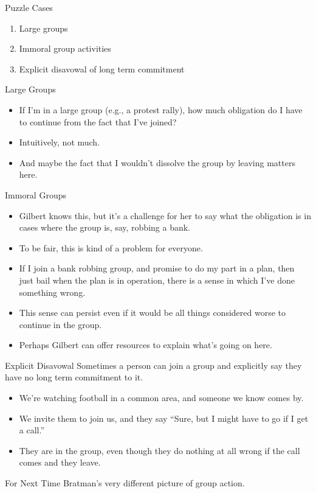 \documentclass[
  ignorenonframetext,
]{beamer}
\providecommand{\tightlist}{%
  \setlength{\itemsep}{0pt}\setlength{\parskip}{0pt}}
\begin{document}
\begin{frame}{Puzzle Cases}
\protect\hypertarget{puzzle-cases}{}
\begin{enumerate}
\tightlist
\item
  Large groups
\item
  Immoral group activities
\item
  Explicit disavowal of long term commitment
\end{enumerate}
\end{frame}

\begin{frame}{Large Groups}
\protect\hypertarget{large-groups}{}
\begin{itemize}
\tightlist
\item
  If I'm in a large group (e.g., a protest rally), how much obligation
  do I have to continue from the fact that I've joined?
\item
  Intuitively, not much.
\item
  And maybe the fact that I wouldn't dissolve the group by leaving
  matters here.
\end{itemize}
\end{frame}

\begin{frame}{Immoral Groups}
\protect\hypertarget{immoral-groups}{}
\begin{itemize}
\tightlist
\item
  Gilbert knows this, but it's a challenge for her to say what the
  obligation is in cases where the group is, say, robbing a bank.
\item
  To be fair, this is kind of a problem for everyone.
\item
  If I join a bank robbing group, and promise to do my part in a plan,
  then just bail when the plan is in operation, there is a sense in
  which I've done something wrong.
\item
  This sense can persist even if it would be all things considered worse
  to continue in the group.
\item
  Perhaps Gilbert can offer resources to explain what's going on here.
\end{itemize}
\end{frame}

\begin{frame}{Explicit Disavowal}
\protect\hypertarget{explicit-disavowal}{}
Sometimes a person can join a group and explicitly say they have no long
term commitment to it.

\begin{itemize}
\tightlist
\item
  We're watching football in a common area, and someone we know comes
  by.
\item
  We invite them to join us, and they say ``Sure, but I might have to go
  if I get a call.''
\item
  They are in the group, even though they do nothing at all wrong if the
  call comes and they leave.
\end{itemize}
\end{frame}

\begin{frame}{For Next Time}
\protect\hypertarget{for-next-time}{}
Bratman's very different picture of group action.
\end{frame}
\end{document}

